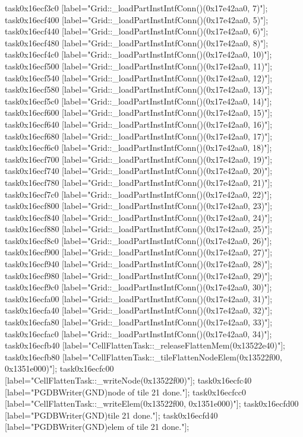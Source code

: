 {	task0x16ecf3c0 [label="Grid::_loadPartInstIntfConn()(0x17e42aa0, 7)"];
	task0x16ecf400 [label="Grid::_loadPartInstIntfConn()(0x17e42aa0, 5)"];
	task0x16ecf440 [label="Grid::_loadPartInstIntfConn()(0x17e42aa0, 6)"];
	task0x16ecf480 [label="Grid::_loadPartInstIntfConn()(0x17e42aa0, 8)"];
	task0x16ecf4c0 [label="Grid::_loadPartInstIntfConn()(0x17e42aa0, 10)"];
	task0x16ecf500 [label="Grid::_loadPartInstIntfConn()(0x17e42aa0, 11)"];
	task0x16ecf540 [label="Grid::_loadPartInstIntfConn()(0x17e42aa0, 12)"];
	task0x16ecf580 [label="Grid::_loadPartInstIntfConn()(0x17e42aa0, 13)"];
	task0x16ecf5c0 [label="Grid::_loadPartInstIntfConn()(0x17e42aa0, 14)"];
	task0x16ecf600 [label="Grid::_loadPartInstIntfConn()(0x17e42aa0, 15)"];
	task0x16ecf640 [label="Grid::_loadPartInstIntfConn()(0x17e42aa0, 16)"];
	task0x16ecf680 [label="Grid::_loadPartInstIntfConn()(0x17e42aa0, 17)"];
	task0x16ecf6c0 [label="Grid::_loadPartInstIntfConn()(0x17e42aa0, 18)"];
	task0x16ecf700 [label="Grid::_loadPartInstIntfConn()(0x17e42aa0, 19)"];
	task0x16ecf740 [label="Grid::_loadPartInstIntfConn()(0x17e42aa0, 20)"];
	task0x16ecf780 [label="Grid::_loadPartInstIntfConn()(0x17e42aa0, 21)"];
	task0x16ecf7c0 [label="Grid::_loadPartInstIntfConn()(0x17e42aa0, 22)"];
	task0x16ecf800 [label="Grid::_loadPartInstIntfConn()(0x17e42aa0, 23)"];
	task0x16ecf840 [label="Grid::_loadPartInstIntfConn()(0x17e42aa0, 24)"];
	task0x16ecf880 [label="Grid::_loadPartInstIntfConn()(0x17e42aa0, 25)"];
	task0x16ecf8c0 [label="Grid::_loadPartInstIntfConn()(0x17e42aa0, 26)"];
	task0x16ecf900 [label="Grid::_loadPartInstIntfConn()(0x17e42aa0, 27)"];
	task0x16ecf940 [label="Grid::_loadPartInstIntfConn()(0x17e42aa0, 28)"];
	task0x16ecf980 [label="Grid::_loadPartInstIntfConn()(0x17e42aa0, 29)"];
	task0x16ecf9c0 [label="Grid::_loadPartInstIntfConn()(0x17e42aa0, 30)"];
	task0x16ecfa00 [label="Grid::_loadPartInstIntfConn()(0x17e42aa0, 31)"];
	task0x16ecfa40 [label="Grid::_loadPartInstIntfConn()(0x17e42aa0, 32)"];
	task0x16ecfa80 [label="Grid::_loadPartInstIntfConn()(0x17e42aa0, 33)"];
	task0x16ecfac0 [label="Grid::_loadPartInstIntfConn()(0x17e42aa0, 34)"];
	task0x16ecfb40 [label="CellFlattenTask::_releaseFlattenMem(0x13522e40)"];
	task0x16ecfb80 [label="CellFlattenTask::_tileFlattenNodeElem(0x13522f00, 0x1351e000)"];
	task0x16ecfc00 [label="CellFlattenTask::_writeNode(0x13522f00)"];
	task0x16ecfc40 [label="PGDBWriter(GND)\nCell node of tile 21 done."];
	task0x16ecfcc0 [label="CellFlattenTask::_writeElem(0x13522f00, 0x1351e000)"];
	task0x16ecfd00 [label="PGDBWriter(GND)\nCell tile 21 done."];
	task0x16ecfd40 [label="PGDBWriter(GND)\nCell elem of tile 21 done."];
}
